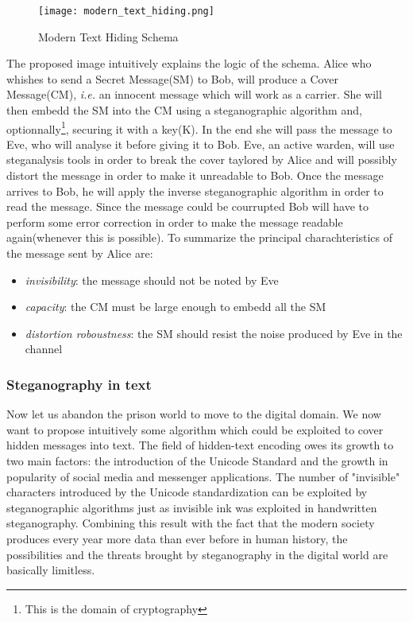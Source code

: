 \documentclass[../../main.tex]{subfiles}
\begin{document}
    \begin{figure}[h]
        \centering
        \caption{Modern Text Hiding Schema}
        \texttt{[image: modern\_text\_hiding.png]}
    \end{figure}
    
    The proposed image intuitively explains the logic of the schema.
    Alice who whishes to send a Secret Message(SM) to Bob, will produce a Cover
    Message(CM), \emph{i.e.} an innocent message which will work as a carrier.
    She will then embedd the SM into the CM using a steganographic algorithm
    and, optionnally\footnote{This is the domain of cryptography}, securing it
    with a key(K).
    In the end she will pass the message to Eve, who will analyse it before
    giving it to Bob.
    Eve, an active warden, will use steganalysis tools in order to break the
    cover taylored by Alice and will possibly distort the message in order to
    make it unreadable to Bob.
    Once the message arrives to Bob, he will apply the inverse steganographic
    algorithm in order to read the message.
    Since the message could be courrupted Bob will have to perform some error
    correction in order to make the message readable again(whenever this is
    possible).
    To summarize the principal charachteristics of the message sent by Alice
    are:
    \begin{itemize}
        \item \emph{invisibility}: the message should not be noted by Eve
        \item \emph{capacity}: the CM must be large enough to embedd all the SM
        \item \emph{distortion roboustness}: the SM should resist the noise
            produced by Eve in the channel
    \end{itemize}

    \subsubsection{Steganography in text}
    Now let us abandon the prison world to move to the digital domain.
    We now want to propose intuitively some algorithm which could be exploited
    to cover hidden messages into text.
    The field of hidden-text encoding owes its growth to two main factors: the
    introduction of the Unicode Standard and the growth in popularity of social
    media and messenger applications.
    The number of "invisible" characters introduced by the Unicode
    standardization can be exploited by steganographic algorithms just as
    invisible ink was exploited in handwritten steganography.
    Combining this result with the fact that the modern society produces every
    year more data than ever before in human history, the possibilities and the
    threats brought by steganography in the digital world are basically
    limitless.
\end{document}
